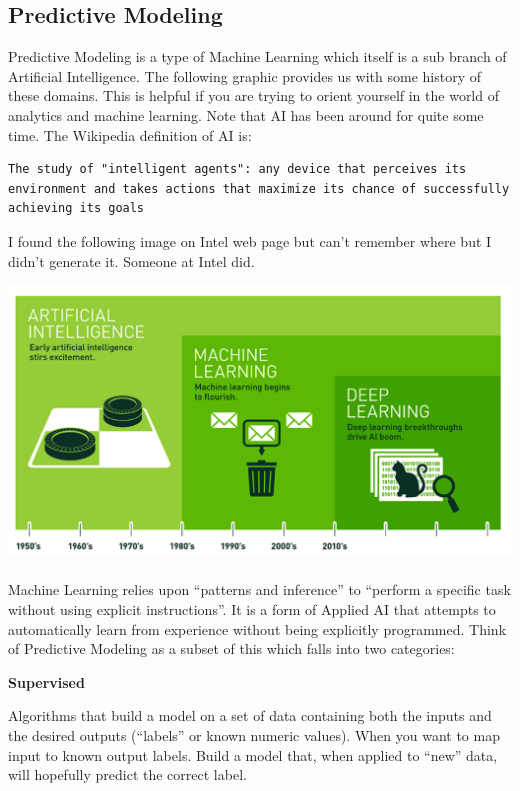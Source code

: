 \documentclass[
]{article}
\begin{document}
\hypertarget{predictive-modeling}{%
\subsection{Predictive Modeling}\label{predictive-modeling}}

Predictive Modeling is a type of Machine Learning which itself is a sub
branch of Artificial Intelligence. The following graphic provides us
with some history of these domains. This is helpful if you are trying to
orient yourself in the world of analytics and machine learning. Note
that AI has been around for quite some time. The Wikipedia definition of
AI is:

\begin{verbatim}
The study of "intelligent agents": any device that perceives its environment and takes actions that maximize its chance of successfully achieving its goals
\end{verbatim}

I found the following image on Intel web page but can't remember where
but I didn't generate it. Someone at Intel did.

\includegraphics{./IMG/intel.png}

Machine Learning relies upon ``patterns and inference'' to ``perform a
specific task without using explicit instructions''. It is a form of
Applied AI that attempts to automatically learn from experience without
being explicitly programmed. Think of Predictive Modeling as a subset of
this which falls into two categories:

\textbf{Supervised}

Algorithms that build a model on a set of data containing both the
inputs and the desired outputs (``labels'' or known numeric values).
When you want to map input to known output labels. Build a model that,
when applied to ``new'' data, will hopefully predict the correct label.
\end{document}
